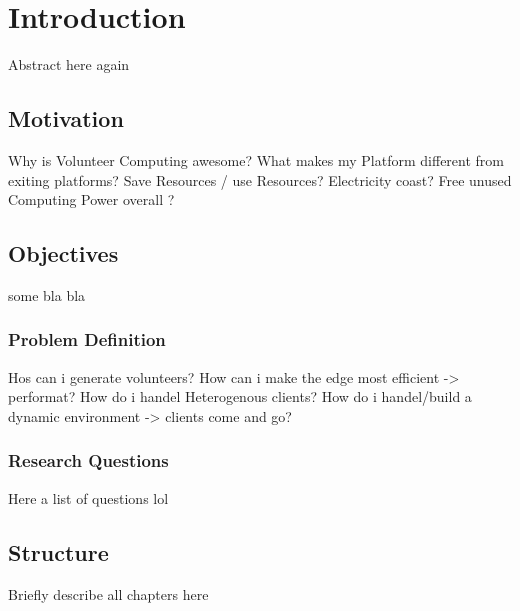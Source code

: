 \chapter{Introduction}
\label{ch:intro}
Abstract here again

\section{Motivation}
\label{sec:intro:motivation}
Why is Volunteer Computing awesome? What makes my Platform different from exiting platforms? Save Resources / use Resources? Electricity coast? Free unused Computing Power overall ?

\section{Objectives}
\label{sec:intro:objectives}
some bla bla
\subsection{Problem Definition}
\label{subsec:into:objectives:problems}
Hos can i generate volunteers? How can i make the edge most efficient -> performat? How do i handel Heterogenous clients? How do i handel/build a dynamic environment -> clients come and go?
\subsection{Research Questions}
\label{subsec:into:objectives:questions}
Here a list of questions lol

\section{Structure}
\label{sec:intro:structure}
Briefly describe all chapters here